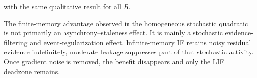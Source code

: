 with the same qualitative result for all $R$.

\begin{takeawaybox}[title={Experiment 7 falsification result}]
The finite-memory advantage observed in the homogeneous stochastic quadratic is not primarily an asynchrony--staleness effect. It is mainly a stochastic evidence-filtering and event-regularization effect. Infinite-memory IF retains noisy residual evidence indefinitely; moderate leakage suppresses part of that stochastic activity. Once gradient noise is removed, the benefit disappears and only the LIF deadzone remains.
\end{takeawaybox}
